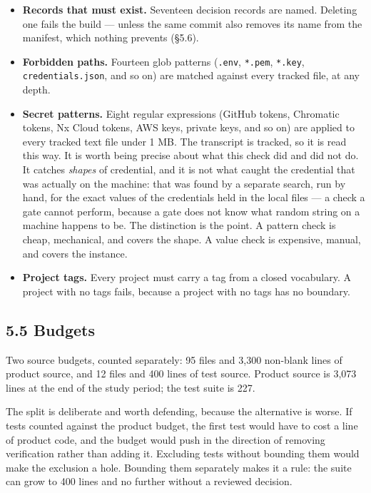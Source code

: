 \documentclass[11pt,a4paper]{article}
\begin{document}
\begin{itemize}
\item \textbf{Records that must exist.} Seventeen decision records are named. Deleting one fails the build --- unless the same commit also removes its name from the manifest, which nothing prevents (\S{}5.6).
\item \textbf{Forbidden paths.} Fourteen glob patterns (\texttt{.env}, \texttt{*.pem}, \texttt{*.key}, \texttt{credentials.json}, and so on) are matched against every tracked file, at any depth.
\item \textbf{Secret patterns.} Eight regular expressions (GitHub tokens, Chromatic tokens, Nx Cloud tokens, AWS keys, private keys, and so on) are applied to every tracked text file under 1 MB. The transcript is tracked, so it is read this way. It is worth being precise about what this check did and did not do. It catches \emph{shapes} of credential, and it is not what caught the credential that was actually on the machine: that was found by a separate search, run by hand, for the exact values of the credentials held in the local files --- a check a gate cannot perform, because a gate does not know what random string on a machine happens to be. The distinction is the point. A pattern check is cheap, mechanical, and covers the shape. A value check is expensive, manual, and covers the instance.
\item \textbf{Project tags.} Every project must carry a tag from a closed vocabulary. A project with no tags fails, because a project with no tags has no boundary.
\end{itemize}

\subsection*{5.5 Budgets}

Two source budgets, counted separately: 95 files and 3,300 non-blank lines of product source, and 12 files and 400 lines of test source. Product source is 3,073 lines at the end of the study period; the test suite is 227.

The split is deliberate and worth defending, because the alternative is worse. If tests counted against the product budget, the first test would have to cost a line of product code, and the budget would push in the direction of removing verification rather than adding it. Excluding tests without bounding them would make the exclusion a hole. Bounding them separately makes it a rule: the suite can grow to 400 lines and no further without a reviewed decision.
\end{document}
